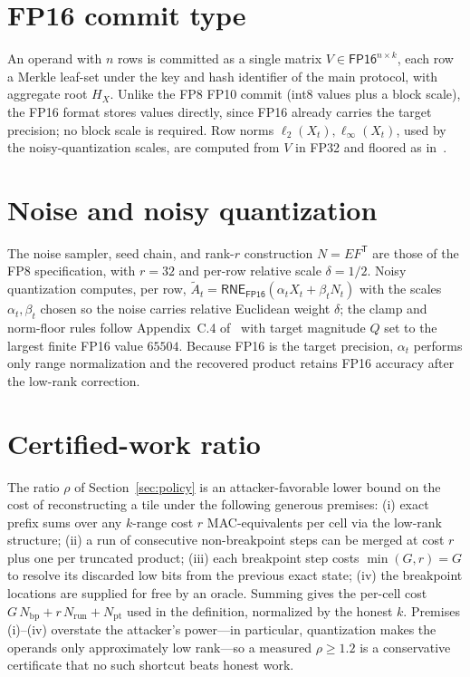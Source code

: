\documentclass[11pt]{article}
\newcommand{\RNE}{\textsf{RNE}}
\newcommand{\At}{\widetilde{A}}
\newcommand{\T}{\mathsf{T}}
\newcommand{\FP}[1]{\textsf{FP#1}}
\begin{document}
\section{FP16 commit type}\label{app:commit}
An operand with $n$ rows is committed as a single matrix $V\in\FP{16}^{n\times k}$, each row a
Merkle leaf-set under the key and hash identifier of the main protocol, with aggregate root $H_X$.
Unlike the \FP{8} FP10 commit (int8 values plus a block scale), the \FP{16} format stores values
directly, since \FP{16} already carries the target precision; no block scale is required. Row norms
$\ell_2(X_t),\ell_\infty(X_t)$, used by the noisy-quantization scales, are computed from $V$ in
\FP{32} and floored as in~\cite{PearlFP8}.

\section{Noise and noisy quantization}\label{app:noise}
The noise sampler, seed chain, and rank-$r$ construction $N=EF^\T$ are those of the \FP{8}
specification, with $r=32$ and per-row relative scale $\delta=1/2$. Noisy quantization computes,
per row, $\At_t=\RNE_{\FP{16}}(\alpha_t X_t+\beta_t N_t)$ with the scales $\alpha_t,\beta_t$ chosen
so the noise carries relative Euclidean weight $\delta$; the clamp and norm-floor rules follow
Appendix~C.4 of~\cite{PearlFP8} with target magnitude $Q$ set to the largest finite \FP{16} value
$65504$. Because \FP{16} is the target precision, $\alpha_t$ performs only range normalization and
the recovered product retains \FP{16} accuracy after the low-rank correction.

\section{Certified-work ratio}\label{app:rho}
The ratio $\rho$ of Section~\ref{sec:policy} is an attacker-favorable lower bound on the cost of
reconstructing a tile under the following generous premises: (i) exact prefix sums over any
$k$-range cost $r$ MAC-equivalents per cell via the low-rank structure; (ii) a run of consecutive
non-breakpoint steps can be merged at cost $r$ plus one per truncated product; (iii) each
breakpoint step costs $\min(G,r)=G$ to resolve its discarded low bits from the previous exact
state; (iv) the breakpoint locations are supplied for free by an oracle. Summing gives the
per-cell cost $G\,N_{\text{bp}}+r\,N_{\text{run}}+N_{\text{pt}}$ used in the definition, normalized
by the honest $k$. Premises (i)--(iv) overstate the attacker's power---in particular, quantization
makes the operands only approximately low rank---so a measured $\rho\ge 1.2$ is a conservative
certificate that no such shortcut beats honest work.
\end{document}
